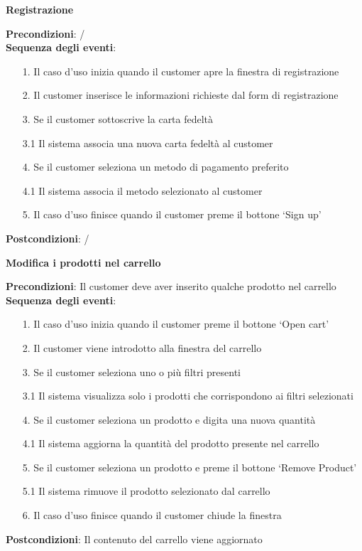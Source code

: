 \documentclass[12pt]{article}
\begin{document}
\textbf{Registrazione}
\begin{tcolorbox}
	\textbf{Precondizioni}: /
\\
	\textbf{Sequenza degli eventi}:
	\begin{enumerate}
	\item[1.] Il caso d’uso inizia quando il customer apre la finestra di registrazione
	\item[2.] Il customer inserisce le informazioni richieste dal form di registrazione
 	\item[3.] Se il customer sottoscrive la carta fedeltà
 	\item[3.1] Il sistema associa una nuova carta fedeltà al customer
 	\item[4.]  Se il customer seleziona un metodo di pagamento preferito
 	\item[4.1] Il sistema associa il metodo selezionato al customer
 	\item[5.] Il caso d’uso finisce quando il customer preme il bottone ‘Sign up’
	\end{enumerate}
	\textbf{Postcondizioni}: /
\end{tcolorbox}



\textbf{Modifica i prodotti nel carrello}
\begin{tcolorbox}
\textbf{Precondizioni}: Il customer deve aver inserito qualche prodotto nel carrello
\\
\textbf{Sequenza degli eventi}:
	\begin{enumerate}
	\item[1.]  Il caso d’uso inizia quando il customer preme il bottone ‘Open cart’
	\item[2.]  Il customer viene introdotto alla finestra del carrello
 	\item[3.]  Se il customer seleziona uno o più filtri presenti
 	\item[3.1] Il sistema visualizza solo i prodotti che corrispondono ai filtri selezionati
 	\item[4.] Se il customer seleziona un prodotto e digita una nuova quantità
 	\item[4.1] Il sistema aggiorna la quantità del prodotto presente nel carrello
  	\item[5.] Se il customer seleziona un prodotto e preme il bottone ‘Remove Product’
  	\item[5.1] Il sistema rimuove il prodotto selezionato dal carrello
 	\item[6.] Il caso d’uso finisce quando il customer chiude la finestra
	\end{enumerate}
\textbf{Postcondizioni}: Il contenuto del carrello viene aggiornato
\end{tcolorbox}
\end{document}
